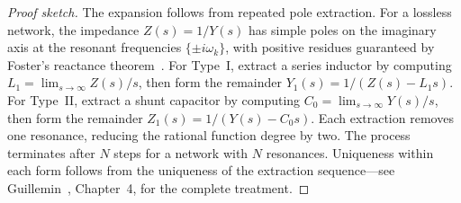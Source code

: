 \documentclass[reprint, floatfix, superscriptaddress, amsmath, amssymb, longbibliography]{revtex4-2}
\begin{document}
\begin{proof}[Proof sketch]
The expansion follows from repeated pole extraction. For a lossless network, the impedance $Z(s) = 1/Y(s)$ has simple poles on the imaginary axis at the resonant frequencies $\{\pm i\omega_k\}$, with positive residues guaranteed by Foster's reactance theorem~\cite{Foster1924}. For Type~I, extract a series inductor by computing $L_1 = \lim_{s\to\infty} Z(s)/s$, then form the remainder $Y_1(s) = 1/(Z(s) - L_1 s)$. For Type~II, extract a shunt capacitor by computing $C_0 = \lim_{s\to\infty} Y(s)/s$, then form the remainder $Z_1(s) = 1/(Y(s) - C_0 s)$. Each extraction removes one resonance, reducing the rational function degree by two. The process terminates after $N$ steps for a network with $N$ resonances. Uniqueness within each form follows from the uniqueness of the extraction sequence---see Guillemin~\cite{Guillemin1957}, Chapter~4, for the complete treatment.
\end{proof}
\end{document}
